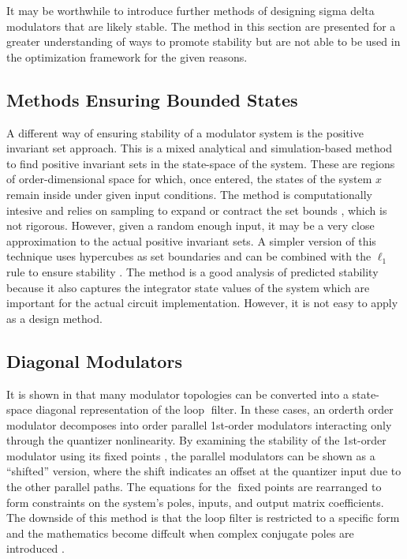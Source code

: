 It may be worthwhile to introduce further methods of designing sigma delta modulators that are likely stable. The method in this section are presented for a greater understanding of ways to promote stability but are not able to be used in the optimization framework for the given reasons.

\subsection{Methods Ensuring Bounded States}

A different way of ensuring stability of a modulator system is the positive invariant set approach. This is a mixed analytical and simulation-based method to find positive invariant sets in the state-space of the system. These are regions of \gls{order}-dimensional space for which, once entered, the states of the system $x$ remain inside under given input conditions. The method is computationally intesive and relies on sampling to expand or contract the set bounds \cite{Schreier1997}, which is not rigorous. However, given a random enough input, it may be a very close approximation to the actual positive invariant sets. A simpler version of this technique uses hypercubes as set boundaries and can be combined with the $\ell_1$ rule to ensure stability \cite{Yagyu2004a}. The method is a good analysis of predicted stability because it also captures the integrator state values of the system which are important for the actual circuit implementation. However, it is not easy to apply as a design method.

\subsection{Diagonal Modulators}

It is shown in \cite{Steiner1997} that many modulator topologies can be converted into a state-space diagonal representation of the loop filter. In these cases, an \gls{order}th order modulator decomposes into \gls{order} parallel 1st-order modulators interacting only through the quantizer nonlinearity. By examining the stability of the 1st-order modulator using its fixed points \cite{Steiner1996}, the parallel modulators can be shown as a ``shifted'' version, where the shift indicates an offset at the quantizer input due to the other parallel paths. The equations for the fixed points are rearranged to form constraints on the system's poles, inputs, and output matrix coefficients. The downside of this method is that the loop filter is restricted to a specific form and the mathematics become diffcult when complex conjugate poles are introduced \cite{Mladenov2013}.

